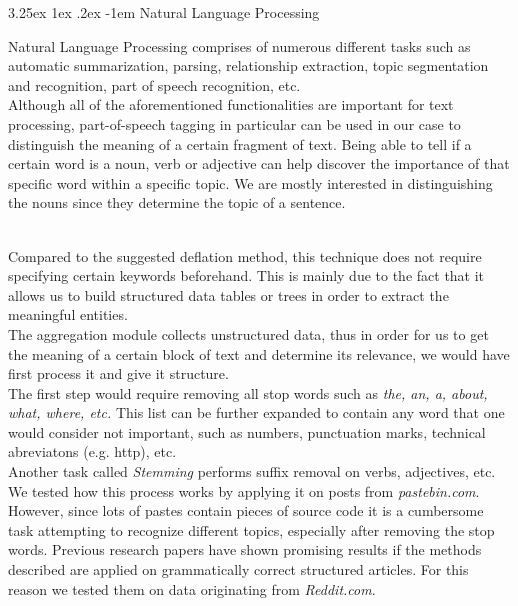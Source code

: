\documentclass[12pt]{article}
\makeatletter
\renewcommand\paragraph{\@startsection{paragraph}{5}{\z@}%
  {3.25ex \@plus1ex \@minus.2ex}%
  {-1em}%
  {\normalfont\normalsize\bfseries}}
\makeatother
\begin{document}
\paragraph{Natural Language Processing}
\hfill \break\\
\parbox{\linewidth}{
Natural Language Processing comprises of numerous different tasks such as automatic summarization, parsing, relationship extraction, topic segmentation and recognition, part of speech recognition, etc.
\hfill \break
\\
Although all of the aforementioned functionalities are important for text processing, part-of-speech tagging in particular can be used in our case to distinguish the meaning of a certain fragment of text. Being able to tell if a certain word is a noun, verb or adjective can help discover the importance of that specific word within a specific topic.  We are mostly interested in distinguishing the nouns since they determine the topic of a sentence.}
\hfill \break
\\
Compared to the suggested deflation method, this technique does not require specifying certain keywords beforehand. This is mainly due to the fact that it allows us to build structured data tables or trees in order to extract the meaningful entities. 
\hfill \break
\\
The aggregation module collects unstructured data, thus in order for us to get the meaning of a certain block of text and determine its relevance, we would have first process it and give it structure. 
\hfill \break
\\
The first step would require removing all stop words such as \textit{the, an, a, about, what, where, etc.} This list can be further expanded to contain any word that one would consider not important, such as numbers, punctuation marks, technical abreviatons (e.g. http), etc.
\hfill \break
\\
Another task called \textit{Stemming} performs suffix removal on verbs, adjectives, etc. 
\hfill \break
\\
We tested how this process works by applying it on posts from \textit{pastebin.com}. However, since lots of pastes contain pieces of source code it is a cumbersome task attempting to recognize different topics, especially after removing the stop words. Previous research papers \cite{second} have shown promising results if the methods described are applied on grammatically correct structured articles. For this reason we tested them on data originating from \textit{Reddit.com}.
\end{document}
